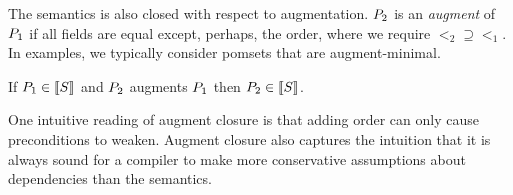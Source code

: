 The semantics is also closed with respect to augmentation.  $P_2$ is an
\emph{augment} of $P_1$ if all fields are equal except, perhaps, the
order, where we require ${\lt_2}\supseteq{\lt_1}$.  In examples, we typically
consider pomsets that are augment-minimal.  %
\begin{lemma}
  If $\aPS_1\in\sembase{\aCmd}$ and $P_2$  augments $P_1$ then $\aPS_2\in\sembase{\aCmd}$.

\end{lemma}
One intuitive reading of augment closure is that adding order can only cause
preconditions to weaken.  Augment closure also captures the intuition that it
is always sound for a compiler to make more conservative assumptions about
dependencies than the semantics.





